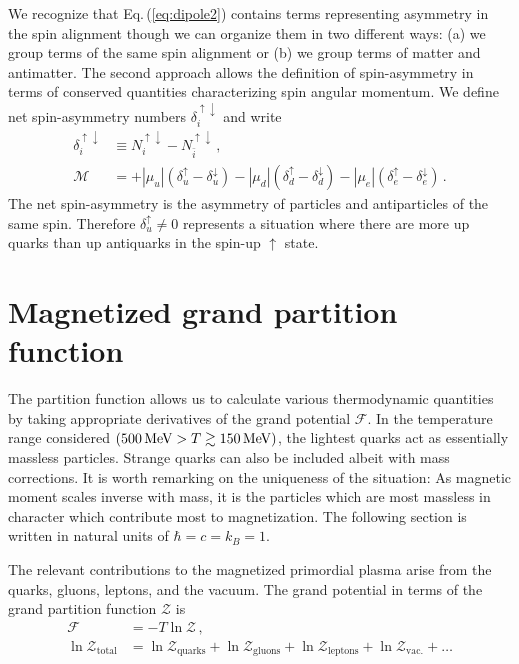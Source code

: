 \documentclass[epjST]{svjour}
\newcommand*{\MeV}{\text{\,MeV}}
\newcommand{\req}[1]{Eq.\,(\ref{#1})}
\begin{document}
We recognize that \req{eq:dipole2} contains terms representing asymmetry in the spin alignment though we can organize them in two different ways: (a) we group terms of the same spin alignment or (b) we group terms of matter and antimatter. The second approach allows the definition of spin-asymmetry in terms of conserved quantities characterizing spin angular momentum. We define net spin-asymmetry numbers $\delta_{i}^{\uparrow\downarrow}$ and write
\begin{align}
\delta_{i}^{\uparrow\downarrow} &\equiv N_{i}^{\uparrow\downarrow}-N_{\bar{i}}^{\uparrow\downarrow}\,,\\
\mathcal{M} &= 
+|\mu_{u}|(\delta_{u}^{\uparrow}-\delta_{u}^{\downarrow})
-|\mu_{d}|(\delta_{d}^{\uparrow}-\delta_{d}^{\downarrow})
-|\mu_{e}|(\delta_{e}^{\uparrow}-\delta_{e}^{\downarrow})\,.
\end{align}
The net spin-asymmetry is the asymmetry of particles and antiparticles of the same spin. Therefore $\delta_{u}^{\uparrow}\neq0$ represents a situation where there are more up quarks than up antiquarks in the spin-up $\uparrow$ state.

\section{Magnetized grand partition function}
\label{sec:partition}
The partition function allows us to calculate various thermodynamic quantities by taking appropriate derivatives of the grand potential $\mathcal{F}$. In the temperature range considered $(500\MeV>T\gtrsim150\MeV)$, the lightest quarks act as essentially massless particles. Strange quarks can also be included albeit with mass corrections. It is worth remarking on the uniqueness of the situation: As magnetic moment scales inverse with mass, it is the particles which are most massless in character which contribute most to magnetization. The following section is written in natural units of \(\hbar=c=k_{B}=1\).

The relevant contributions to the magnetized primordial plasma arise from the quarks, gluons, leptons, and the vacuum. The grand potential in terms of the grand partition function $\mathcal{Z}$ is
\begin{align}
\label{eq:parts}
\mathcal{F} &= -T\ln\mathcal{Z}\,,\\
\ln\mathcal{Z}_{\mathrm{total}} &=
\ln\mathcal{Z}_{\mathrm{quarks}} +
\ln\mathcal{Z}_{\mathrm{gluons}} +
\ln\mathcal{Z}_{\mathrm{leptons}}+
\ln\mathcal{Z}_{\mathrm{vac.}}+\ldots 
\end{align}
\end{document}
